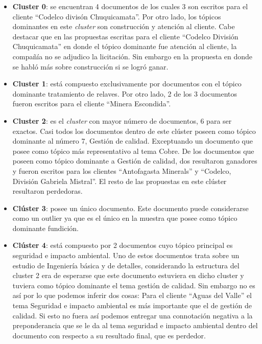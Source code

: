     \begin{itemize}
        \item \textbf{Cluster 0}: se encuentran 4 documentos de los cuales 3 son escritos para el cliente ``Codelco divisón Chuquicamata''. Por otro lado, los tópicos dominantes en este \textit{cluster} son construcción y atención al cliente. Cabe destacar que en las propuestas escritas para el cliente ``Codelco División Chuquicamata'' en donde el tópico dominante fue atención al cliente, la compañía no se adjudico la licitación. Sin embargo en la propuesta en donde se habló más sobre construcción si se logró ganar. 
        \item \textbf{Cluster 1}: está compuesto exclusivamente por documentos con el tópico dominante tratamiento de relaves. Por otro lado, 2 de los 3 documentos fueron escritos para el cliente ``Minera Escondida''.
        \item \textbf{Cluster 2}: es el \textit{cluster} con mayor número de documentos, 6 para ser exactos. Casi todos los documentos dentro de este clúster poseen como tópico dominante al número 7, Gestión de calidad. Exceptuando un documento que posee como tópico más representativo al tema Cobre. De los documentos que poseen como tópico dominante a Gestión de calidad, dos resultaron ganadores y fueron escritos para los clientes ``Antofagasta Minerals'' y ``Codelco, División Gabriela Mistral''. El resto de las propuestas en este clúster resultaron perdedoras. 
        \item \textbf{Clúster 3}:  posee un único documento. Este documento puede considerarse como un outlier ya que es el único en la muestra que posee como tópico dominante fundición.
        \item \textbf{Clúster 4}: está compuesto por 2 documentos cuyo tópico principal es seguridad e impacto ambiental. Uno de estos documentos trata sobre un estudio de Ingeniería básica y de detalles, considerando la estructura del cluster 2 era de esperarse que este documento estuviera en dicho cluster y tuviera como tópico dominante el tema gestión de calidad. Sin embargo no es así por lo que podemos inferir dos cosas: Para el cliente ``Aguas del Valle'' el tema Seguridad e impacto ambiental es más importante que el de gestión de calidad. Si esto no fuera así podemos entregar una connotación negativa a la preponderancia que se le da al tema seguridad e impacto ambiental dentro del documento con respecto a su resultado final, que es perdedor.
    \end{itemize}
    

